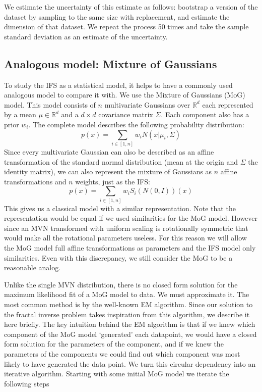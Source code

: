 \documentclass[10pt,a4paper,oneside]{article}
\theoremstyle{definition}
\begin{document}
We estimate the uncertainty of this estimate as follows: bootstrap a version of the dataset by sampling to the same size with replacement, and estimate the dimension of that dataset. We repeat the process 50 times and take the sample standard deviation as an estimate of the uncertainty.

\subsection*{Analogous model: Mixture of Gaussians}

To study the IFS as a statistical model, it helps to have a commonly used analogous model to compare it with. We use the Mixture of Gaussians (MoG) model. This model consists of $n$ multivariate Gaussians over ${\mathbb R}^d$ each represented by a mean $\mu \in {\mathbb R}^d$ and a $d \times d$ covariance matrix $\Sigma$. Each component also has a prior $w_i$. The complete model describes the following probability distribution:
\[
p(x) = \sum_{i \in [1,n]} w_i N(x|\mu_i, \Sigma)
\]
Since every multivariate Gaussian can also be described as an affine transformation of the standard normal distribution (mean at the origin and $\Sigma$ the identity matrix), we can also represent the mixture of Gaussians as $n$ affine transformations and $n$ weights, just as the IFS:
\[
p(x) = \sum_{i \in [1,n]} w_i S_i(N(0, I))(x)
\]
This gives us a classical model with a similar representation. Note that the representation would be equal if we used similarities for the MoG model. However since an MVN transformed with uniform scaling is rotationally symmetric that would make all the rotational parameters useless. For this reason we will allow the MoG model full affine transformations as parameters and the IFS model only similarities. Even with this discrepancy, we still consider the MoG to be a reasonable analog.

Unlike the single MVN distribution, there is no closed form solution for the maximum likelihood fit of a MoG model to data. We must approximate it. The most common method is by the well-known EM algorithm. Since our solution to the fractal inverse problem takes inspiration from this algorithm, we describe it here briefly. The key intuition behind the EM algorithm is that if we knew which component of the MoG model `generated' each datapoint, we would have a closed form solution for the parameters of the component, and if we knew the parameters of the components we could find out which component was most likely to have generated the data point. We turn this circular dependency into an iterative algorithm. Starting with some initial MoG model we iterate the following steps
\end{document}
